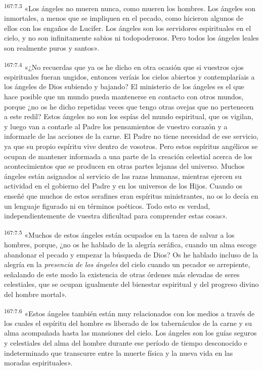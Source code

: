 \par 
\textsuperscript{167:7.3} «Los ángeles no mueren nunca, como mueren los hombres. Los ángeles son inmortales, a menos que se impliquen en el pecado, como hicieron algunos de ellos con los engaños de Lucifer. Los ángeles son los servidores espirituales en el cielo, y no son infinitamente sabios ni todopoderosos. Pero todos los ángeles leales son realmente puros y santos».

\par 
\textsuperscript{167:7.4} «¿No recuerdas que ya os he dicho en otra ocasión que si vuestros ojos espirituales fueran ungidos, entonces veríais los cielos abiertos y contemplaríais a los ángeles de Dios subiendo y bajando? El ministerio de los ángeles es el que hace posible que un mundo pueda mantenerse en contacto con otros mundos, porque ¿no os he dicho repetidas veces que tengo otras ovejas que no pertenecen a este redil? Estos ángeles no son los espías del mundo espiritual, que os vigilan, y luego van a contarle al Padre los pensamientos de vuestro corazón y a informarle de las acciones de la carne. El Padre no tiene necesidad de ese servicio, ya que su propio espíritu vive dentro de vosotros. Pero estos espíritus angélicos se ocupan de mantener informada a una parte de la creación celestial acerca de los acontecimientos que se producen en otras partes lejanas del universo. Muchos ángeles están asignados al servicio de las razas humanas, mientras ejercen su actividad en el gobierno del Padre y en los universos de los Hijos. Cuando os enseñé que muchos de estos serafines eran espíritus ministrantes, no os lo decía en un lenguaje figurado ni en términos poéticos. Todo esto es verdad, independientemente de vuestra dificultad para comprender estas cosas».

\par 
\textsuperscript{167:7.5} «Muchos de estos ángeles están ocupados en la tarea de salvar a los hombres, porque, ¿no os he hablado de la alegría seráfica, cuando un alma escoge abandonar el pecado y empezar la búsqueda de Dios? Os he hablado incluso de la alegría en la \textit{presencia de los ángeles} del cielo cuando un pecador se arrepiente, señalando de este modo la existencia de otras órdenes más elevadas de seres celestiales, que se ocupan igualmente del bienestar espiritual y del progreso divino del hombre mortal».

\par 
\textsuperscript{167:7.6} «Estos ángeles también están muy relacionados con los medios a través de los cuales el espíritu del hombre es liberado de los tabernáculos de la carne y su alma acompañada hasta las mansiones del cielo. Los ángeles son los guías seguros y celestiales del alma del hombre durante ese período de tiempo desconocido e indeterminado que transcurre entre la muerte física y la nueva vida en las moradas espirituales».

